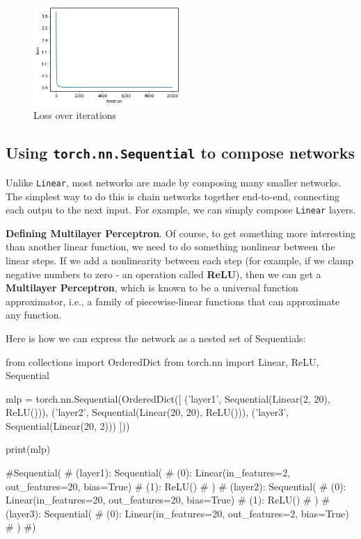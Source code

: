 \begin{figure}[H]
    \centering
    \includegraphics[width=0.5\textwidth]{assets/fig9.png}
    \caption{Loss over iterations}
\end{figure}

\subsection{Using \texttt{torch.nn.Sequential} to compose networks}

Unlike \texttt{Linear}, most networks are made by composing many smaller networks. The simplest way to do this is chain networks together end-to-end, connecting each outpu to the next input. For example, we can simply compose \texttt{Linear} layers. 

\textbf{Defining Multilayer Perceptron}. Of course, to get something more interesting than another linear function, we need to do something nonlinear between the linear steps. If we add a nonlinearity between each step (for example, if we clamp negative numbers to zero - an operation called \textbf{ReLU}), then we can get a \textbf{Multilayer Perceptron}, which is known to be a universal function approximator, i.e., a family of piecewise-linear functions that can approximate any function. 

Here is how we can express the network as a nested set of Sequentials:

\begin{codeblock}[language=python]
from collections import OrderedDict
from torch.nn import Linear, ReLU, Sequential

mlp = torch.nn.Sequential(OrderedDict([
('layer1', Sequential(Linear(2, 20), ReLU())),
('layer2', Sequential(Linear(20, 20), ReLU())),
('layer3', Sequential(Linear(20, 2)))
]))

print(mlp)

#Sequential(
#  (layer1): Sequential(
#    (0): Linear(in_features=2, out_features=20, bias=True)
#    (1): ReLU()
#  )
#  (layer2): Sequential(
#    (0): Linear(in_features=20, out_features=20, bias=True)
#    (1): ReLU()
#  )
#  (layer3): Sequential(
#    (0): Linear(in_features=20, out_features=2, bias=True)
#  )
#)
\end{codeblock}

